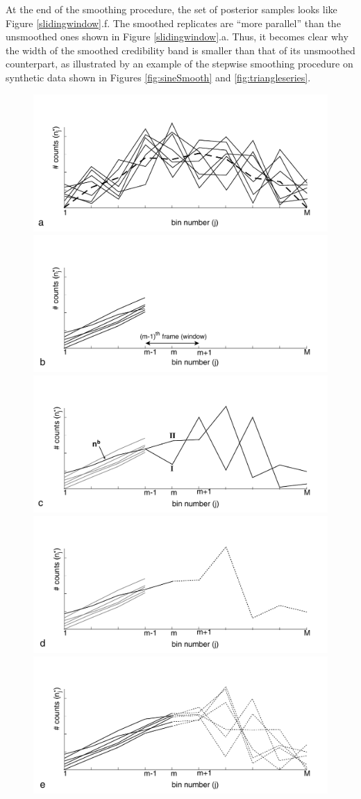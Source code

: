 \documentclass{article}
\begin{document}
At the  end of the smoothing  procedure, the set  of posterior samples
looks like Figure  \ref{slidingwindow}.f.  The smoothed replicates are
``more   parallel''  than   the  unsmoothed   ones  shown   in  Figure
\ref{slidingwindow}.a.  Thus,  it becomes clear  why the width  of the
smoothed  credibility band  is  smaller than  that  of its  unsmoothed
counterpart, as  illustrated by an  example of the  stepwise smoothing
procedure on synthetic data  shown in Figures \ref{fig:sineSmooth} and
\ref{fig:triangleseries}.

\begin{figure}[h]
  \centering
  \includegraphics[width=.49\textwidth]{A1.pdf}
  \includegraphics[width=.49\textwidth]{A2.pdf}\\
  \includegraphics[width=.49\textwidth]{A3.pdf}
  \includegraphics[width=.49\textwidth]{A4.pdf}\\
  \includegraphics[width=.49\textwidth]{A5.pdf}

\end{figure}
\end{document}
